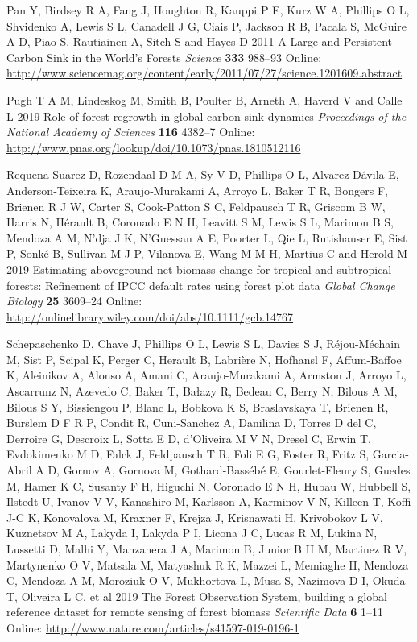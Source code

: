 \documentclass[
]{article}
\begin{document}
\leavevmode\hypertarget{ref-pan_large_2011}{}%
Pan Y, Birdsey R A, Fang J, Houghton R, Kauppi P E, Kurz W A, Phillips O
L, Shvidenko A, Lewis S L, Canadell J G, Ciais P, Jackson R B, Pacala S,
McGuire A D, Piao S, Rautiainen A, Sitch S and Hayes D 2011 A Large and
Persistent Carbon Sink in the World's Forests \emph{Science}
\textbf{333} 988--93 Online:
\url{http://www.sciencemag.org/content/early/2011/07/27/science.1201609.abstract}

\leavevmode\hypertarget{ref-pugh_role_2019}{}%
Pugh T A M, Lindeskog M, Smith B, Poulter B, Arneth A, Haverd V and
Calle L 2019 Role of forest regrowth in global carbon sink dynamics
\emph{Proceedings of the National Academy of Sciences} \textbf{116}
4382--7 Online:
\url{http://www.pnas.org/lookup/doi/10.1073/pnas.1810512116}

\leavevmode\hypertarget{ref-requena_suarez_estimating_2019}{}%
Requena Suarez D, Rozendaal D M A, Sy V D, Phillips O L, Alvarez‐Dávila
E, Anderson‐Teixeira K, Araujo‐Murakami A, Arroyo L, Baker T R, Bongers
F, Brienen R J W, Carter S, Cook‐Patton S C, Feldpausch T R, Griscom B
W, Harris N, Hérault B, Coronado E N H, Leavitt S M, Lewis S L, Marimon
B S, Mendoza A M, N'dja J K, N'Guessan A E, Poorter L, Qie L,
Rutishauser E, Sist P, Sonké B, Sullivan M J P, Vilanova E, Wang M M H,
Martius C and Herold M 2019 Estimating aboveground net biomass change
for tropical and subtropical forests: Refinement of IPCC default rates
using forest plot data \emph{Global Change Biology} \textbf{25} 3609--24
Online: \url{http://onlinelibrary.wiley.com/doi/abs/10.1111/gcb.14767}

\leavevmode\hypertarget{ref-schepaschenko_forest_2019}{}%
Schepaschenko D, Chave J, Phillips O L, Lewis S L, Davies S J,
Réjou-Méchain M, Sist P, Scipal K, Perger C, Herault B, Labrière N,
Hofhansl F, Affum-Baffoe K, Aleinikov A, Alonso A, Amani C,
Araujo-Murakami A, Armston J, Arroyo L, Ascarrunz N, Azevedo C, Baker T,
Bałazy R, Bedeau C, Berry N, Bilous A M, Bilous S Y, Bissiengou P, Blanc
L, Bobkova K S, Braslavskaya T, Brienen R, Burslem D F R P, Condit R,
Cuni-Sanchez A, Danilina D, Torres D del C, Derroire G, Descroix L,
Sotta E D, d'Oliveira M V N, Dresel C, Erwin T, Evdokimenko M D, Falck
J, Feldpausch T R, Foli E G, Foster R, Fritz S, Garcia-Abril A D, Gornov
A, Gornova M, Gothard-Bassébé E, Gourlet-Fleury S, Guedes M, Hamer K C,
Susanty F H, Higuchi N, Coronado E N H, Hubau W, Hubbell S, Ilstedt U,
Ivanov V V, Kanashiro M, Karlsson A, Karminov V N, Killeen T, Koffi J-C
K, Konovalova M, Kraxner F, Krejza J, Krisnawati H, Krivobokov L V,
Kuznetsov M A, Lakyda I, Lakyda P I, Licona J C, Lucas R M, Lukina N,
Lussetti D, Malhi Y, Manzanera J A, Marimon B, Junior B H M, Martinez R
V, Martynenko O V, Matsala M, Matyashuk R K, Mazzei L, Memiaghe H,
Mendoza C, Mendoza A M, Moroziuk O V, Mukhortova L, Musa S, Nazimova D
I, Okuda T, Oliveira L C, et al 2019 The Forest Observation System,
building a global reference dataset for remote sensing of forest biomass
\emph{Scientific Data} \textbf{6} 1--11 Online:
\url{http://www.nature.com/articles/s41597-019-0196-1}
\end{document}
